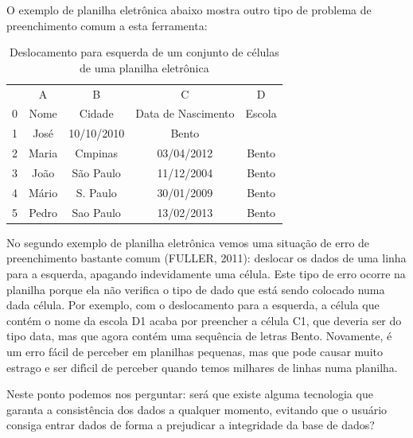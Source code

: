 \documentclass[
12pt,		%
openright,	%
twoside,  %
a4paper,			%
chapter=TITLE,		%
english,			%
french,				%
spanish,			%
brazil				%
]{USPSC-classe/USPSC}
\begin{document}
O exemplo de planilha eletr\^onica abaixo mostra outro tipo de problema de preenchimento comum a esta ferramenta:














\begin{table}[htb]
\tiny
\caption{\label{f6feaa39313aa0691b7fdadc84175a203e68bf77}Deslocamento para esquerda de um conjunto de c\'elulas de uma planilha eletr\^onica}

\centering
\begin{tabular}{|c|c|c|c|c|}
\hline
  &  A  &  B  &  C  &  D  \\
0 & Nome  &  Cidade  &  Data de Nascimento  &  Escola \\
1 & Jos\'e  &  10/10/2010  &  Bento  &   \\
2 & Maria  &  Cmpinas  &  03/04/2012  &  Bento \\
3 & Jo\~ao  &  S\~ao Paulo  &  11/12/2004  &  Bento \\
4 & M\'ario  &  S. Paulo  &  30/01/2009  &  Bento \\
5 & Pedro  &  Sao Paulo  &  13/02/2013  &  Bento \\
\hline
\end{tabular}
\end{table}


No segundo exemplo de planilha eletr\^onica vemos uma situa\c{c}\~ao de erro de preenchimento bastante comum  (FULLER, 2011): deslocar os dados de uma linha para a esquerda, apagando indevidamente uma c\'elula. Este tipo de erro ocorre na planilha porque ela n\~ao verifica o tipo de dado que est\'a sendo colocado numa dada c\'elula. Por exemplo, com o deslocamento para a esquerda, a c\'elula que cont\'em o nome da escola D1 acaba por preencher a c\'elula C1, que deveria ser do tipo data, mas que agora cont\'em uma sequ\^encia de letras \textquotedbl Bento\textquotedbl . Novamente, \'e um erro f\'acil de perceber em planilhas pequenas, mas que pode causar muito estrago e ser dif\'{\i}cil de perceber quando temos milhares de linhas numa planilha.










Neste ponto podemos nos perguntar: ser\'a que existe alguma tecnologia que garanta a consist\^encia dos dados a qualquer momento, evitando que o usu\'ario consiga entrar dados de forma a prejudicar a integridade da base de dados?
\end{document}
